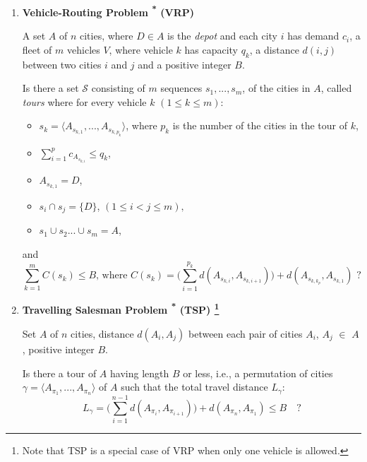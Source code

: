 \documentclass{mprop}
\theoremstyle{definition}
\begin{document}
\begin{enumerate}

\item \textbf{Vehicle-Routing Problem \textsuperscript{*} (VRP)}
\begin{instance}
A set $A$ of $n$ cities, where $D \in A$ is the \textit{depot} and each city $i$ has demand $c_{i}$, a fleet of $m$ vehicles $V$, where vehicle $k$ has capacity $q_{k}$, a distance $d(i,j)$ between two cities $i$ and $j$ and a positive integer $B$.
\end{instance}

\begin{question}
\color{red}
Is there a set $\mathcal{S}$ consisting of $m$ sequences $s_{1},...,s_{m}$, of the cities in $A$, called \textit{tours}
where for every vehicle $k$ $(1 \leq k \leq m)$:
\begin{itemize}
\item $s_{k} = \langle A_{s_{k,1}},...,A_{s_{k,p_{k}}} \rangle$, \quad where $p_{k}$ is the number of the cities in the tour of $k$,
\item $\sum_{i = 1}^{p} c_{A_{s_{k,i}}} \leq q_{k}$,
\item $A_{s_{k,1}} = D$,
\item $s_{i} \cap s_{j} = \{D\}$, \quad $(1 \leq i < j \leq m),$
\item $s_{1} \cup s_{2} ... \cup s_{m} = A$,
\end{itemize}
and
$$ \sum_{k=1}^{m} C(s_{k}) \leq B \textrm{, where } C(s_{k}) = \bigg( \sum_{i=1}^{p_{k}} d(A_{s_{k,i}}, A_{s_{k,i+1}}) \bigg) + d(A_{s_{k,k_{p}}}, A_{s_{k,1}}) \textrm{ ?}$$
\end{question}


\item \textbf{Travelling Salesman Problem \textsuperscript{*} (TSP) \footnote{Note that TSP is a special case of VRP when only one vehicle is allowed.}}
\begin{instance}
Set $A$ of $n$ cities, distance $d(A_{i}, A_{j})$ between each pair of cities $A_{i}$, $A_{j}$ $\in$ $A$, positive integer $B$.
\end{instance}

\begin{question}
Is there a tour of $A$ having length $B$ or less, i.e., a permutation of cities $\gamma = \langle A_{\pi_{1}},...,A_{\pi_{n}} \rangle $ of $A$ such that the total travel distance $L_{\gamma}$:
$$L_{\gamma} = \bigg( \sum_{i=1}^{n-1} d(A_{\pi_{i}}, A_{\pi_{i+1}}) \bigg) + d(A_{\pi_{n}}, A_{\pi_{1}}) \leq B \quad \textrm{?}$$
\end{question}


\end{enumerate}
\end{document}
